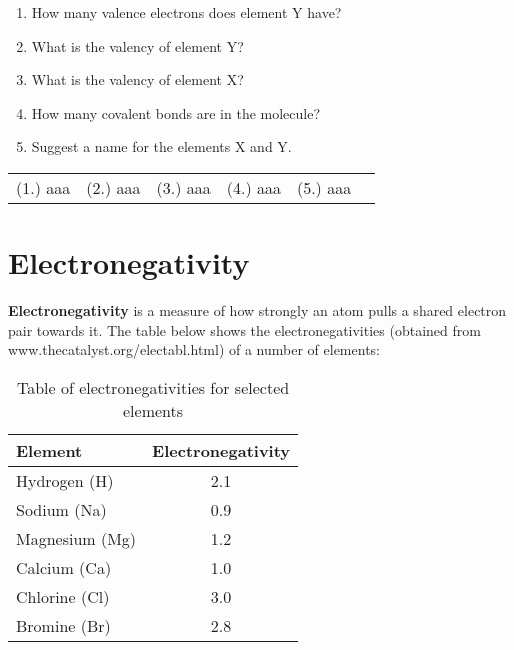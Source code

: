 {\begin{enumerate}
{\begin{enumerate}
\item{How many valence electrons does element Y have?}
\item{What is the valency of element Y?}
\item{What is the valency of element X?}
\item{How many covalent bonds are in the molecule?}
\item{Suggest a name for the elements X and Y.}
\end{enumerate}
}

\end{enumerate}
\practiceinfo

\begin{tabular}[h]{cccccc}
(1.) aaa & (2.) aaa & (3.) aaa & (4.) aaa & (5.) aaa  & 
 \end{tabular}
}







\section{Electronegativity}

\textbf{Electronegativity} is a measure of how strongly an atom pulls a shared electron pair towards it. The table below shows the electronegativities (obtained from www.thecatalyst.org/electabl.html) of a number of elements:

\begin{table}[!h]
\begin{center}
\caption{Table of electronegativities for selected elements}
\begin{tabular}{|l|c|}\hline
\textbf{Element} & \textbf{Electronegativity}\\\hline
Hydrogen (H) & 2.1\\\hline
Sodium (Na) & 0.9\\\hline
Magnesium (Mg) & 1.2\\\hline
Calcium (Ca) & 1.0\\\hline
Chlorine (Cl) & 3.0\\\hline
Bromine (Br) & 2.8\\\hline
\end{tabular}
\end{center}
\end{table}


